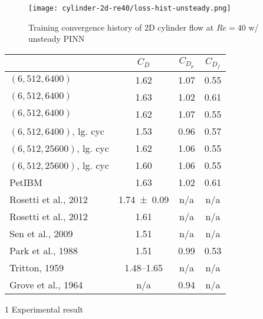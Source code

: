 \lipsum[1]

\begin{figure}[!hbt]
    \centering%
    \texttt{[image: cylinder-2d-re40/loss-hist-unsteady.png]}%
    \caption{%
        Training convergence history of 2D cylinder flow at $Re=\num{40}$ w/ unsteady PINN
    }
    \label{fig:cylinder-re40-unsteady-pinn-loss}%
\end{figure}

\lipsum[1]

\begin{table}[hbt!]
    \centering%
    \begin{threeparttable}[b]
        \begin{tabular}{lccc}
            \toprule
            & $C_D$ & $C_{D_p}$ & $C_{D_f}$ \\
            \midrule
            $(6, 512, 6400)$\tnote{\dag} & 1.62 & 1.07 & 0.55 \\
            $(6, 512, 6400)$\tnote{\ddag} & 1.63 & 1.02 & 0.61 \\
            $(6, 512, 6400)$\tnote{\S,\dag} & 1.62 & 1.07 & 0.55 \\
            $(6, 512, 6400)$, lg. cyc\tnote{\S,\ddag} & 1.53 & 0.96 & 0.57 \\
            $(6, 512, 25600)$, lg. cyc\tnote{\S,\dag} & 1.62 & 1.06 & 0.55 \\
            $(6, 512, 25600)$, lg. cyc\tnote{\S,\ddag} & 1.60 & 1.06 & 0.55 \\
            PetIBM & 1.63 & 1.02 & 0.61 \\
            Rosetti et al., 2012\cite{rosetti_urans_2012}\tnote{1} & \num{1.74+-0.09} & n/a & n/a \\
            Rosetti et al., 2012\cite{rosetti_urans_2012}\tnote{2} & 1.61 & n/a & n/a \\
            Sen et al., 2009\cite{sen_steady_2009}\tnote{2} & 1.51 & n/a & n/a \\
            Park et al., 1988\cite{park_numerical_1998}\tnote{2} & 1.51 & 0.99 & 0.53 \\
            Tritton, 1959\cite{tritton_experiments_1959}\tnote{1} & 1.48--1.65 & n/a & n/a \\
            Grove et al., 1964\cite{grove_experimental_1964}\tnote{1} & n/a & 0.94 & n/a \\
            \bottomrule
        \end{tabular}%
        \begin{tablenotes}
            \footnotesize
            \item [1] Experimental result

\end{tablenotes}
\end{threeparttable}
\end{table}
